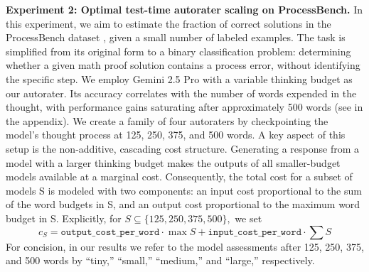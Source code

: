 \documentclass{article} %
\newcommand{\jacob}[1]{ {\color{blue}[JE: #1]}}
\begin{document}
\textbf{Experiment 2: Optimal test-time autorater scaling on ProcessBench.}
In this experiment, we aim to estimate the fraction of correct solutions in the ProcessBench dataset \citep{zheng2024processbench}, given a small number of labeled examples. The task is simplified from its original form to a binary classification problem: determining whether a given math proof solution contains a process error, without identifying the specific step. We employ Gemini 2.5 Pro with a variable thinking budget as our autorater. Its accuracy correlates with the number of words expended in the thought, with performance gains saturating after approximately 500 words (see  in the appendix). We create a family of four autoraters by checkpointing the model's thought process at 125, 250, 375, and 500 words. A key aspect of this setup is the non-additive, cascading cost structure. Generating a response from a model with a larger thinking budget makes the outputs of all smaller-budget models available at a marginal cost. Consequently, the total cost for a subset of models S is modeled with two components: an input cost proportional to the sum of the word budgets in S, and an output cost proportional to the maximum word budget in S. Explicitly, for $S\subseteq\{125,250,375,500\},$ we set
    \begin{equation}\label{eq:cost}
    c_S=\texttt{output\_cost\_per\_word}\cdot \max S+\texttt{input\_cost\_per\_word}\cdot\sum S    
    \end{equation} 
For concision, in our results we refer to the model assessments after 125, 250, 375, and 500 words by ``tiny,'' ``small,'' ``medium,'' and ``large,'' respectively.

\end{document}
